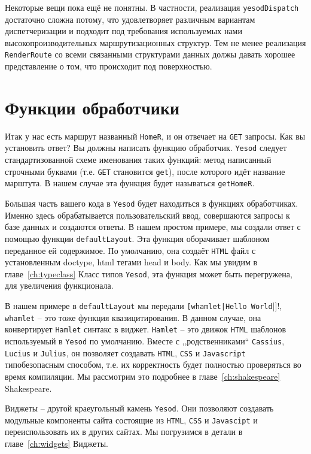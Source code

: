 Некоторые вещи пока ещё не понятны. В частности, реализация \lstinline!yesodDispatch!
достаточно сложна потому, что удовлетворяет различным вариантам диспетчеризации
и подходит под требования используемых нами высокопроизводительных 
маршрутизационных структур.
Тем не менее реализация \lstinline!RenderRoute! со всеми связанными 
структурами данных должы давать хорошее представление о том, что происходит 
под поверхностью. %

\section{Функции обработчики}

Итак у нас есть маршрут названный \lstinline!HomeR!, и он отвечает на \texttt{GET} запросы. 
Как вы установить ответ? Вы должны написать функцию обработчик. \texttt{Yesod} следует
стандартизованной схеме именования таких функций: 
метод написанный строчными буквами (т.е. \texttt{GET} становится \lstinline!get!), после которого идёт 
название марштута. В нашем случае эта функция будет называться \lstinline!getHomeR!.

Большая часть вашего кода в \texttt{Yesod} будет находиться в функциях обработчиках. 
Именно здесь обрабатывается пользовательский ввод, совершаются запросы к базе данных и создаются ответы. 
В нашем простом примере, мы создали ответ с помощью функции \lstinline!defaultLayout!. 
Эта функция оборачивает шаблоном переданное ей содержимое.  По умолчанию, 
она создаёт \texttt{HTML} файл с установленным doctype, html тегами head и body. 
Как мы увидим в главе~\ref{ch:typeclass} Класс типов \texttt{Yesod}, 
эта функция может быть перегружена, для увеличения функционала.

В нашем примере в \lstinline!defaultLayout! мы передали 
\lstinline![whamlet|Hello World!|]!, \lstinline!whamlet! -- это тоже 
функция квазицитирования. В данном случае, она конвертирует 
\texttt{Hamlet} синтакс в виджет. \texttt{Hamlet} -- это движок 
\texttt{HTML} шаблонов используемый в \texttt{Yesod} по умолчанию. 
Вместе с ,,родственниками`` \texttt{Cassius}, \texttt{Lucius} 
и \texttt{Julius}, он позволяет создавать \texttt{HTML}, \texttt{CSS}
и \texttt{Javascript} типобезопасным способом, т.е. их корректность будет 
полностью проверяться во время компиляции. Мы рассмотрим это подробнее в 
главе~\ref{ch:shakespeare} Shakespeare.

Виджеты -- другой краеугольный камень \texttt{Yesod}. Они позволяют создавать 
модульные компоненты сайта состоящие из \texttt{HTML}, \texttt{CSS} и 
\texttt{Javascipt} и переиспользовать их в других сайтах. 
Мы погрузимся в детали в главе~\ref{ch:widgets} Виджеты.

